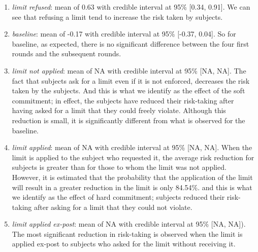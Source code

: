\documentclass[
]{book}
\providecommand{\tightlist}{%
  \setlength{\itemsep}{0pt}\setlength{\parskip}{0pt}}
\begin{document}
\begin{enumerate}
\def\labelenumi{\arabic{enumi}.}
\tightlist
\item
  \emph{limit refused}: mean of 0.63
  with credible interval at 95\% {[}0.34, 0.91{]}.
  We can see that refusing a limit tend to increase the risk taken by subjects.
\item
  \emph{baseline}: mean of -0.17
  with credible interval at 95\% {[}-0.37, 0.04{]}.
  So for baseline, as expected, there is no significant difference between the
  four first rounds and the subsequent rounds.
\item
  \emph{limit not applied}: mean of NA
  with credible interval at 95\% {[}NA, NA{]}.
  The fact that subjects ask for a limit even if it is not enforced, decreases the
  risk taken by the subjects.
  And this is what we identify as the effect of the soft commitment; in effect,
  the subjects have reduced their risk-taking after having asked for a limit that
  they could freely violate.
  Although this reduction is small, it is significantly different from what is
  observed for the baseline.
\item
  \emph{limit applied}: mean of NA
  with credible interval at 95\% {[}NA, NA{]}.
  When the limit is applied to the subject who requested it, the average risk
  reduction for subjects is greater than for those to whom the limit was not
  applied.
  However, it is estimated that the probability that the application of the limit
  will result in a greater reduction in the limit is only
  84.54\%.
  and this is what we identify as the effect of hard commitment; subjects reduced
  their risk-taking after asking for a limit that they could not violate.
\item
  \emph{limit applied ex-post}: mean of NA
  with credible interval at 95\% {[}NA, NA{]}).
  The most significant reduction in risk-taking is observed when the limit is
  applied ex-post to subjects who asked for the limit without receiving it.
\end{enumerate}
\end{document}
